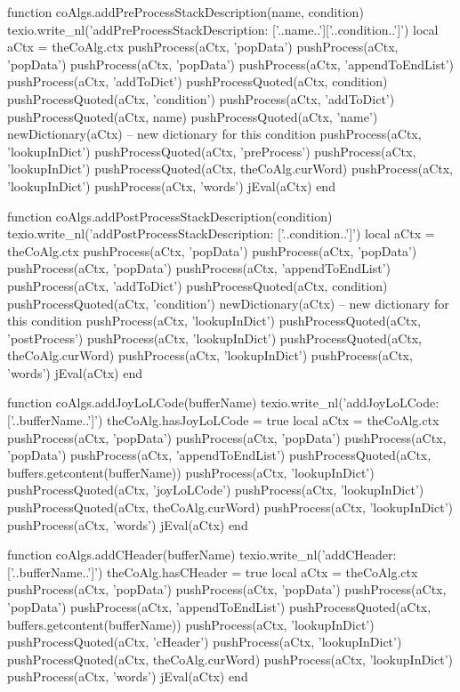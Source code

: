 function coAlgs.addPreProcessStackDescription(name, condition)
  texio.write_nl('addPreProcessStackDescription: ['..name..']['..condition..']')
  local aCtx = theCoAlg.ctx
  pushProcess(aCtx, 'popData')
  pushProcess(aCtx, 'popData')
  pushProcess(aCtx, 'popData')
  pushProcess(aCtx, 'appendToEndList')
  pushProcess(aCtx, 'addToDict')
  pushProcessQuoted(aCtx, condition)
  pushProcessQuoted(aCtx, 'condition')
  pushProcess(aCtx, 'addToDict')
  pushProcessQuoted(aCtx, name)
  pushProcessQuoted(aCtx, 'name')
  newDictionary(aCtx) -- new dictionary for this condition
  pushProcess(aCtx, 'lookupInDict')
  pushProcessQuoted(aCtx, 'preProcess')
  pushProcess(aCtx, 'lookupInDict')
  pushProcessQuoted(aCtx, theCoAlg.curWord)
  pushProcess(aCtx, 'lookupInDict')
  pushProcess(aCtx, 'words')
  jEval(aCtx)
end

function coAlgs.addPostProcessStackDescription(condition)
  texio.write_nl('addPostProcessStackDescription: ['..condition..']')
  local aCtx = theCoAlg.ctx
  pushProcess(aCtx, 'popData')
  pushProcess(aCtx, 'popData')
  pushProcess(aCtx, 'popData')
  pushProcess(aCtx, 'appendToEndList')
  pushProcess(aCtx, 'addToDict')
  pushProcessQuoted(aCtx, condition)
  pushProcessQuoted(aCtx, 'condition')
  newDictionary(aCtx) -- new dictionary for this condition
  pushProcess(aCtx, 'lookupInDict')
  pushProcessQuoted(aCtx, 'postProcess')
  pushProcess(aCtx, 'lookupInDict')
  pushProcessQuoted(aCtx, theCoAlg.curWord)
  pushProcess(aCtx, 'lookupInDict')
  pushProcess(aCtx, 'words')
  jEval(aCtx)
end

function coAlgs.addJoyLoLCode(bufferName)
  texio.write_nl('addJoyLoLCode: ['..bufferName..']')
  theCoAlg.hasJoyLoLCode = true
  local aCtx = theCoAlg.ctx
  pushProcess(aCtx, 'popData')
  pushProcess(aCtx, 'popData')
  pushProcess(aCtx, 'popData')
  pushProcess(aCtx, 'appendToEndList')
  pushProcessQuoted(aCtx, buffers.getcontent(bufferName))
  pushProcess(aCtx, 'lookupInDict')
  pushProcessQuoted(aCtx, 'joyLoLCode')
  pushProcess(aCtx, 'lookupInDict')
  pushProcessQuoted(aCtx, theCoAlg.curWord)
  pushProcess(aCtx, 'lookupInDict')
  pushProcess(aCtx, 'words')
  jEval(aCtx)
end

function coAlgs.addCHeader(bufferName)
  texio.write_nl('addCHeader: ['..bufferName..']')
  theCoAlg.hasCHeader = true
  local aCtx = theCoAlg.ctx
  pushProcess(aCtx, 'popData')
  pushProcess(aCtx, 'popData')
  pushProcess(aCtx, 'popData')
  pushProcess(aCtx, 'appendToEndList')
  pushProcessQuoted(aCtx, buffers.getcontent(bufferName))
  pushProcess(aCtx, 'lookupInDict')
  pushProcessQuoted(aCtx, 'cHeader')
  pushProcess(aCtx, 'lookupInDict')
  pushProcessQuoted(aCtx, theCoAlg.curWord)
  pushProcess(aCtx, 'lookupInDict')
  pushProcess(aCtx, 'words')
  jEval(aCtx)
end

